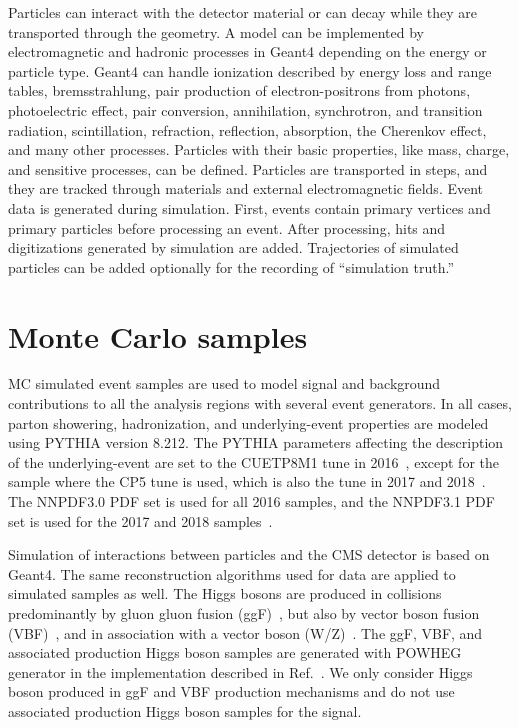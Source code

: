 Particles can interact with the detector material or can decay while they are transported through the geometry. A model can be implemented by electromagnetic and hadronic processes in Geant4 depending on the energy or particle type. Geant4 can handle ionization described by energy loss and range tables, bremsstrahlung, pair production of electron-positrons from photons, photoelectric effect, pair conversion, annihilation, synchrotron, and transition radiation, scintillation, refraction, reflection, absorption, the Cherenkov effect, and many other processes. Particles with their basic properties, like mass, charge, and sensitive processes, can be defined. Particles are transported in steps, and they are tracked through materials and external electromagnetic fields. Event data is generated during simulation. First, events contain primary vertices and primary particles before processing an event. After processing, hits and digitizations generated by simulation are added. Trajectories of simulated particles can be added optionally for the recording of ``simulation truth.''


\section{Monte Carlo samples}

MC simulated event samples are used to model signal and background contributions to all the analysis regions with several event generators. In all cases, parton showering, hadronization, and underlying-event properties are modeled using PYTHIA version 8.212. The PYTHIA parameters affecting the description of the underlying-event are set to the CUETP8M1 tune in 2016~\cite{Khachatryan:2015pea}, except for the \ttbar sample where the CP5 tune is used, which is also the tune in 2017 and 2018~\cite{CMS:2018zub}. The NNPDF3.0 PDF set is used for all 2016 samples, and the NNPDF3.1 PDF set is used for the 2017 and 2018 samples~\cite{Ball:2017nwa}.

Simulation of interactions between particles and the CMS detector is based on Geant4. The same reconstruction algorithms used for data are applied to simulated samples as well. The Higgs bosons are produced in \pp collisions predominantly by gluon gluon fusion (ggF)~\cite{Georgi:1977gs}, but also by vector boson fusion (VBF)~\cite{Cahn:1986zv}, and in association with a vector boson (W/Z)~\cite{Glashow:1978ab}. The ggF, VBF, and associated production Higgs boson samples are generated with POWHEG generator in the implementation described in Ref.~\cite{Heinrich:2017kxx, Buchalla:2018yce}. We only consider Higgs boson produced in ggF and VBF production mechanisms and do not use associated production Higgs boson samples for the signal.

